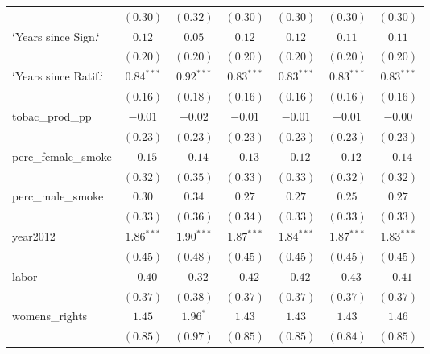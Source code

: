 \begin{table}[!h]
\begin{center}
\begin{tabular}{l c c c c c c }
                        & $(0.30)$     & $(0.32)$     & $(0.30)$     & $(0.30)$     & $(0.30)$     & $(0.30)$     \\
`Years since Sign.`     & $0.12$       & $0.05$       & $0.12$       & $0.12$       & $0.11$       & $0.11$       \\
                        & $(0.20)$     & $(0.20)$     & $(0.20)$     & $(0.20)$     & $(0.20)$     & $(0.20)$     \\
`Years since Ratif.`    & $0.84^{***}$ & $0.92^{***}$ & $0.83^{***}$ & $0.83^{***}$ & $0.83^{***}$ & $0.83^{***}$ \\
                        & $(0.16)$     & $(0.18)$     & $(0.16)$     & $(0.16)$     & $(0.16)$     & $(0.16)$     \\
tobac\_prod\_pp         & $-0.01$      & $-0.02$      & $-0.01$      & $-0.01$      & $-0.01$      & $-0.00$      \\
                        & $(0.23)$     & $(0.23)$     & $(0.23)$     & $(0.23)$     & $(0.23)$     & $(0.23)$     \\
perc\_female\_smoke     & $-0.15$      & $-0.14$      & $-0.13$      & $-0.12$      & $-0.12$      & $-0.14$      \\
                        & $(0.32)$     & $(0.35)$     & $(0.33)$     & $(0.33)$     & $(0.32)$     & $(0.32)$     \\
perc\_male\_smoke       & $0.30$       & $0.34$       & $0.27$       & $0.27$       & $0.25$       & $0.27$       \\
                        & $(0.33)$     & $(0.36)$     & $(0.34)$     & $(0.33)$     & $(0.33)$     & $(0.33)$     \\
year2012                & $1.86^{***}$ & $1.90^{***}$ & $1.87^{***}$ & $1.84^{***}$ & $1.87^{***}$ & $1.83^{***}$ \\
                        & $(0.45)$     & $(0.48)$     & $(0.45)$     & $(0.45)$     & $(0.45)$     & $(0.45)$     \\
labor                   & $-0.40$      & $-0.32$      & $-0.42$      & $-0.42$      & $-0.43$      & $-0.41$      \\
                        & $(0.37)$     & $(0.38)$     & $(0.37)$     & $(0.37)$     & $(0.37)$     & $(0.37)$     \\
womens\_rights          & $1.45$       & $1.96^{*}$   & $1.43$       & $1.43$       & $1.43$       & $1.46$       \\
                        & $(0.85)$     & $(0.97)$     & $(0.85)$     & $(0.85)$     & $(0.84)$     & $(0.85)$     \\

\end{tabular}
\end{center}
\end{table}
